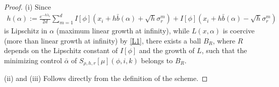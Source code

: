 \documentclass[a4paper,  twoside, 10pt, leqno]{amsart}
\theoremstyle{remark}
\theoremstyle{definition}
\begin{document}
\begin{proof}
    
 \noindent   (i) Since 
\begin{align*}
    h ( \alpha ) := \frac{e^{-h \lambda_{r}}}{2d} \sum_{m=1}^{d}  I [ \phi ] ( x_{i} + h \bar{b} ( \alpha ) + \sqrt{h} \sigma_{r}^{m}) + I [ \phi ] ( x_{i} + h \bar{b} ( \alpha ) - \sqrt{h} \sigma_{r}^{m})
\end{align*}
is Lipschitz in $\alpha$ (maximum linear growth at infinity), 
while  $L ( x, \alpha )$ is coercive (more than linear growth at infinity) by \ref{L1}, 
there exists a ball $B_{R}$, where $R$ depends on the Lipschitz constant 
of  $I [ \phi ]$ and the growth of $L$, 
such that the minimizing control $ \bar{\alpha}$ of $S_{\rho,h,r} [ \mu ] ( \phi,i,k )$ 
belongs to $ B_{R}$. \medskip

\noindent (ii) and (iii) Follows directly from the definition of the scheme. \medskip


\end{proof}
\end{document}
